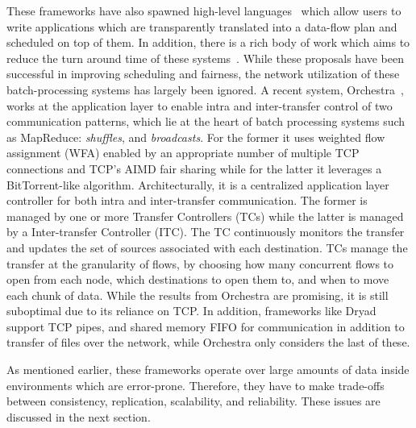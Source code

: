 \documentclass[a4paper,12pt,twoside,openright]{report}
\begin{document}
These frameworks have also spawned high-level
languages~\cite{Olston:2008:PLN,Pike:2005:IDP,Murray:2010:SCS,Yu:2008:DSG} which
allow users to write applications which are transparently translated into a
data-flow plan and scheduled on top of them. In addition, there is a rich body
of work which aims to reduce the turn around time of these
systems~\cite{Zaharia:2010:DSS,Isard:2009:QFS,Zaharia:2008:IMP}. While these
proposals have been successful in improving scheduling and fairness, the network
utilization of these batch-processing systems has largely been ignored. A recent
system, Orchestra~\cite{Chowdhury:2011:MDT}, works at the application layer to
enable intra and inter-transfer control of two communication patterns, which lie
at the heart of batch processing systems such as MapReduce:
\emph{shuffles}, and \emph{broadcasts}. For the former it uses weighted flow
assignment (WFA) enabled by an appropriate number of multiple TCP connections
and TCP's AIMD fair sharing while for the latter it leverages a BitTorrent-like
algorithm. Architecturally, it is a centralized application layer controller for
both intra and inter-transfer communication. The former is managed by one or
more Transfer Controllers (TCs) while the latter is managed by a Inter-transfer
Controller (ITC). The TC continuously monitors the transfer and updates the set
of sources associated with each destination. TCs manage the transfer at the
granularity of flows, by choosing how many concurrent flows to open from each
node, which destinations to open them to, and when to move each chunk of data.
While the results from Orchestra are promising, it is still suboptimal due to
its reliance on TCP. In addition, frameworks like Dryad support TCP pipes, and
shared memory FIFO for communication in addition to transfer of files over the
network, while Orchestra only considers the last of these.

As mentioned earlier, these frameworks operate over large amounts of data inside
environments which are error-prone. Therefore, they have to make trade-offs
between consistency, replication, scalability, and reliability. These issues are
discussed in the next section.
\end{document}
